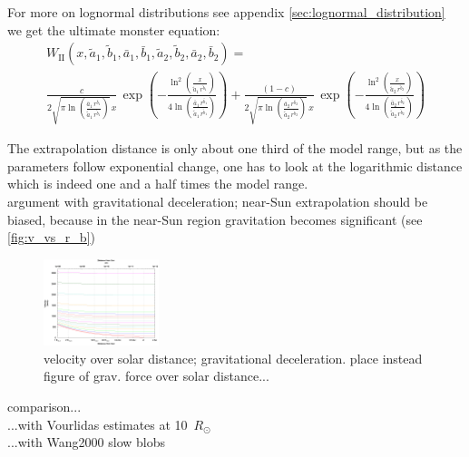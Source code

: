 
For more on lognormal distributions see appendix \autoref{sec:lognormal_distribution}\\


we get the ultimate monster equation:\\
\begin{align}
	W_\text{II}(x,\tilde{a}_1, \tilde{b}_1, \bar{a}_1, \bar{b}_1, \tilde{a}_2, \tilde{b}_2, \bar{a}_2, \bar{b}_2) =\\
	\frac{c}{2 \sqrt{\pi \ln\left(\frac{\bar{a}_1 \, r^{\bar{b}_1}}{\tilde{a}_1 \, r^{\tilde{b}_1}}\right)} \, x} \, \exp\left(- \frac{\ln^2\left(\frac{x}{\tilde{a}_1 \, r^{\tilde{b}_1}}\right)}{4 \ln\left(\frac{\bar{a}_1 \, r^{\bar{b}_1}}{\tilde{a}_1 \, r^{\tilde{b}_1}}\right)}\right) + \frac{(1 - c)}{2 \sqrt{\pi \ln\left(\frac{\bar{a}_2 \, r^{\bar{b}_2}}{\tilde{a}_2 \, r^{\tilde{b}_2}}\right)} \, x} \, \exp\left(- \frac{\ln^2\left(\frac{x}{\tilde{a}_2 \, r^{\tilde{b}_2}}\right)}{4 \ln\left(\frac{\bar{a}_2 \, r^{\bar{b}_2}}{\tilde{a}_2 \, r^{\tilde{b}_2}}\right)}\right)
\end{align}

The extrapolation distance is only about one third of the model range, but as the parameters follow exponential change, one has to look at the logarithmic distance which is indeed one and a half times the model range.\\

argument with gravitational deceleration; near-Sun extrapolation should be biased, because in the near-Sun region gravitation becomes significant (see \autoref{fig:v_vs_r_b})\\
\begin{figure}[htb]
	\centering
	\includegraphics[width=0.3\textwidth]{images/gnuplots/v_vs_r_b.png}
	\caption{velocity over solar distance; gravitational deceleration. place instead figure of grav. force over solar distance...}
	\label{fig:v_vs_r_b}
\end{figure}


comparison...\\
...with Vourlidas estimates at 10~$R_\odot$\\
...with Wang2000 slow blobs\\


